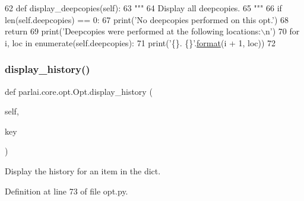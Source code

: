 \begin{DoxyCode}
62     \textcolor{keyword}{def }display\_deepcopies(self):
63         \textcolor{stringliteral}{"""}
64 \textcolor{stringliteral}{        Display all deepcopies.}
65 \textcolor{stringliteral}{        """}
66         \textcolor{keywordflow}{if} len(self.deepcopies) == 0:
67             print(\textcolor{stringliteral}{'No deepcopies performed on this opt.'})
68             \textcolor{keywordflow}{return}
69         print(\textcolor{stringliteral}{'Deepcopies were performed at the following locations:\(\backslash\)n'})
70         \textcolor{keywordflow}{for} i, loc \textcolor{keywordflow}{in} enumerate(self.deepcopies):
71             print(\textcolor{stringliteral}{'\{\}. \{\}'}.\hyperlink{namespaceparlai_1_1chat__service_1_1services_1_1messenger_1_1shared__utils_a32e2e2022b824fbaf80c747160b52a76}{format}(i + 1, loc))
72 
\end{DoxyCode}
\mbox{\label{classparlai_1_1core_1_1opt_1_1Opt_a289669796ec7843657e2adbf52d3a294}} 
\subsubsection{\texorpdfstring{display\+\_\+history()}{display\_history()}}
{\footnotesize\ttfamily def parlai.\+core.\+opt.\+Opt.\+display\+\_\+history (\begin{DoxyParamCaption}\item[{}]{self,  }\item[{}]{key }\end{DoxyParamCaption})}

\begin{DoxyVerb}Display the history for an item in the dict.
\end{DoxyVerb}
 

Definition at line 73 of file opt.\+py.


